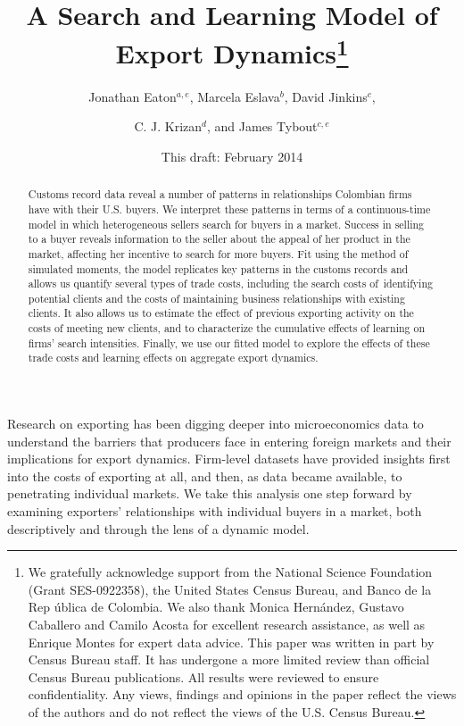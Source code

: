 \documentclass[12pt,titlepage]{article}
\begin{document}
\title{A Search and Learning Model of Export Dynamics\thanks{%
We gratefully acknowledge support from the National Science Foundation
(Grant SES-0922358), the United States Census Bureau, and Banco de la Rep%
\'{u}blica de Colombia. We also thank Monica Hern\'{a}ndez, Gustavo
Caballero and Camilo Acosta for excellent research assistance, as well as
Enrique Montes for expert data advice. This paper was written in part by
Census Bureau staff. It has undergone a more limited review than official
Census Bureau publications. All results were reviewed to ensure
confidentiality. Any views, findings and opinions in the paper reflect the
views of the authors and do not reflect the views of the U.S. Census Bureau.}%
\\
}
\author{Jonathan Eaton$^{a,e}$, Marcela Eslava$^{b}$, David Jinkins$^{c}$,
\and C. J. Krizan$^{d}$, and James Tybout$^{c,e}$}
\date{This draft: February 2014}
\maketitle

\begin{abstract}
Customs record data reveal a number of patterns in relationships Colombian
firms have with their U.S. buyers. We interpret these patterns in terms of a
continuous-time model in which heterogeneous sellers search for buyers in a
market. Success in selling to a buyer reveals information to the seller
about the appeal of her product in the market, affecting her incentive to
search for more buyers. Fit using the method of simulated moments, the model
replicates key patterns in the customs records and allows us quantify
several types of trade costs, including the search costs of\ identifying
potential clients and the costs of maintaining business relationships with
existing clients. It also allows us to estimate the effect of previous
exporting activity on the costs of meeting new clients, and to characterize
the cumulative effects of learning on firms' search intensities. Finally, we
use our fitted model to explore the effects of these trade costs and
learning effects on aggregate export dynamics.
\end{abstract}


\thispagestyle{empty}


\newpage

Research on exporting has been digging deeper into microeconomics data to
understand the barriers that producers face in entering foreign markets and
their implications for export dynamics. Firm-level datasets have provided
insights first into the costs of exporting at all, and then, as data became
available, to penetrating individual markets. We take this analysis one step
forward by examining exporters' relationships with individual buyers in a
market, both descriptively and through the lens of a dynamic model.
\end{document}
